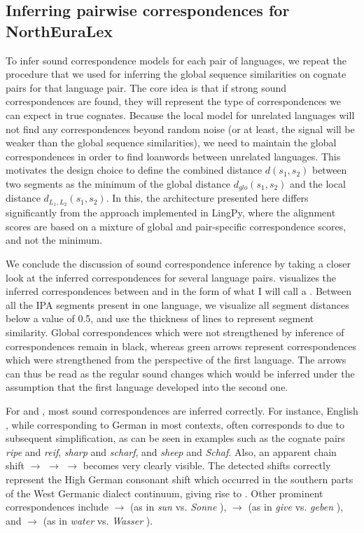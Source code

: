 \subsection{Inferring pairwise correspondences for NorthEuraLex}
To infer sound correspondence models for each pair of languages, we repeat the procedure that we
used for inferring the global sequence similarities on cognate pairs for that language pair.
The core idea is that if strong sound correspondences are found, they will represent the
type of correspondences we can expect in true cognates. Because the local model for unrelated
languages will not find any correspondences beyond random noise (or at least, the signal will
be weaker than the global sequence similarities), we need to maintain the global correspondences
in order to find loanwords between unrelated languages. This motivates the design choice
to define the combined distance $d(s_1,s_2)$ between two segments as the minimum
of the global distance $d_{glo}(s_1,s_2)$ and the local distance $d_{L_1,L_2}(s_1,s_2)$.
In this, the architecture presented here differs significantly from the approach implemented
in LingPy, where the alignment scores are based on a mixture of global and pair-specific
correspondence scores, and not the minimum.

We conclude the discussion of sound correspondence inference by taking a closer look at the inferred correspondences for several language pairs.  visualizes the inferred correspondences between  and  in the form of what I will call a \textit{}. Between all the IPA segments present in one language, we visualize all segment distances below a value of 0.5, and use the thickness of lines to represent segment similarity. Global correspondences which were not strengthened by inference of correspondences remain in black, whereas green arrows represent correspondences which were strengthened from the perspective of the first language. The arrows can thus be read as the regular sound changes which would be inferred under the assumption that the first language developed into the second one.

For  and , most sound correspondences are inferred correctly. For instance, English \ipa{[p]}, while corresponding to German \ipa{[\t{pf}]} in most contexts, often corresponds to \ipa{[f]} due to subsequent simplification, as can be seen in examples such as the cognate pairs \textit{ripe} and \textit{reif}, \textit{sharp} and \textit{scharf}, and \textit{sheep} and \textit{Schaf}. Also, an apparent chain shift \ipa{[D]} $\rightarrow$ \ipa{[d]} $\rightarrow$ \ipa{[t]} $\rightarrow$ \ipa{[\t{ts}]} becomes very clearly visible. The detected shifts correctly represent the High German consonant shift which occurred in the southern parts of the West Germanic dialect continuum, giving rise to . Other prominent correspondences include \ipa{[s]} $\rightarrow$ \ipa{[z]} (as in \textit{sun} \ipa{[s2n]} vs. \textit{Sonne} \ipa{[zOn@]}), \ipa{[v]} $\rightarrow$ \ipa{[b]} (as in \textit{give} \ipa{[gIv]} vs. \textit{geben} \ipa{[ge:b@n]}), and \ipa{[w]} $\rightarrow$ \ipa{[v]} 
(as in \textit{water} \ipa{[wO:t@]} vs. \textit{Wasser} \ipa{[vas5]}).

